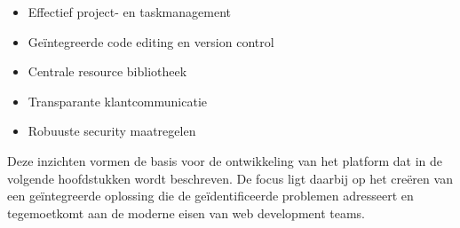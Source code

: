 \begin{itemize}
    \item Effectief project- en taskmanagement
    \item Geïntegreerde code editing en version control
    \item Centrale resource bibliotheek
    \item Transparante klantcommunicatie
    \item Robuuste security maatregelen
\end{itemize}

Deze inzichten vormen de basis voor de ontwikkeling van het platform dat in de volgende hoofdstukken wordt beschreven. De focus ligt daarbij op het creëren van een geïntegreerde oplossing die de geïdentificeerde problemen adresseert en tegemoetkomt aan de moderne eisen van web development teams.


